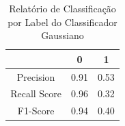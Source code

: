 \documentclass{beamer}
\begin{document}
\begin{frame}
\begin{columns}
\begin{column}{0.5\textwidth}
\begin{table}[H]
\begin{small}
\begin{tabular}{ccc}
                            \hline
                        \end{tabular}
                    \end{small}
                \end{table}
            \end{column}
            \begin{column}{0.5\textwidth}
                \begin{table}[H]

                    \centering
                    \caption{\label{tab:cr3-gnb} Relatório de Classificação por Label do Classificador Gaussiano}
                    \begin{small}
                        \begin{tabular}{ccc}
                        
                            \hline
                                                    & 0                & 1\\
                            \hline
                            Precision               & 0.91             & 0.53\\
                            Recall Score            & 0.96             & 0.32\\
                            F1-Score                & 0.94             & 0.40\\
                            
                            \hline
                        \end{tabular}
                    \end{small}
                
                \end{table}
            \end{column}
            \end{columns}    
    \end{frame}
    
\end{document}
